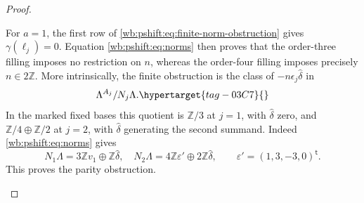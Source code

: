 \begin{proof}
\begin{enumerate}[label=\arabic*.,leftmargin=*]
For $a=1$, the first row of \eqref{wb:pshift:eq:finite-norm-obstruction} gives $\gamma(\ell_j)=0$.
Equation \eqref{wb:pshift:eq:norms} then proves that the order-three filling imposes no
restriction on $n$, whereas the order-four filling imposes precisely
$n\in2\mathbb Z$. More intrinsically, the finite obstruction is the
class of $-n\epsilon_j\widehat\delta$ in
\begin{equation}
 \Lambda^{A_j}/N_j\Lambda.
 \hypertarget{tag-03C7}{}\label{wb:pshift:eq:finite-class}
\end{equation}
In the marked fixed bases this quotient is
$\mathbb Z/3$ at $j=1$, with $\widehat\delta$ zero, and
$\mathbb Z/4\oplus\mathbb Z/2$ at $j=2$, with
$\widehat\delta$ generating the second summand. Indeed \eqref{wb:pshift:eq:norms} gives
\[
 N_1\Lambda=3\mathbb Z v_1\oplus\mathbb Z\widehat\delta,
 \quad
 N_2\Lambda=4\mathbb Z\varepsilon'\oplus
                      2\mathbb Z\widehat\delta,
 \qquad \varepsilon'=(1,3,-3,0)^{\mathsf t}.
\]
This proves the parity obstruction.
\end{enumerate}
\end{proof}
